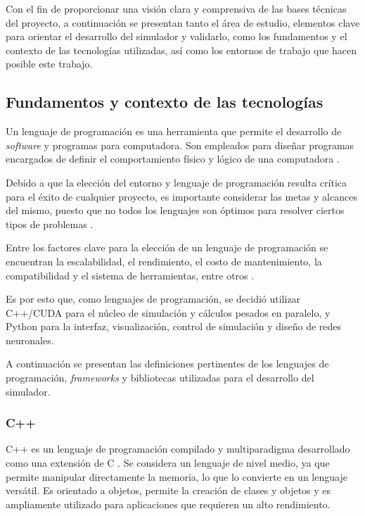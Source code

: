Con el fin de proporcionar una visión clara y comprensiva de las bases técnicas del proyecto, a continuación se presentan tanto el área de estudio, elementos clave para orientar el desarrollo del simulador y validarlo, como los fundamentos y el contexto de las tecnologías utilizadas, así como los entornos de trabajo que hacen posible este trabajo. 

\subsection{Fundamentos y contexto de las tecnologías}

Un lenguaje de programación es una herramienta que permite el desarrollo de \textit{software} y programas para computadora. Son empleados para diseñar programas encargados de definir el comportamiento físico y lógico de una computadora \cite{uapa2025_lenguajes}.

Debido a que la elección del entorno y lenguaje de programación resulta crítica para el éxito de cualquier proyecto, es importante considerar las metas y alcances del mismo, puesto que no todos los lenguajes son óptimos para resolver ciertos tipos de problemas \cite{clickpanda2023_entorno}.

Entre los factores clave para la elección de un lenguaje de programación se encuentran la escalabilidad, el rendimiento, el costo de mantenimiento, la compatibilidad y el sistema de herramientas, entre otros \cite{clickpanda2023_entorno}.

Es por esto que, como lenguajes de programación, se decidió utilizar C++/CUDA para el núcleo de simulación y cálculos pesados en paralelo, y Python para la interfaz, visualización, control de simulación y diseño de redes neuronales. 

A continuación se presentan las definiciones pertinentes de los lenguajes de programación, \textit{frameworks} y bibliotecas utilizadas para el desarrollo del simulador.

\subsubsection{C++}

C++ es un lenguaje de programación compilado y multiparadigma desarrollado como una extensión de C \cite{valladolid_c}. Se considera un lenguaje de nivel medio, ya que permite manipular directamente la memoria, lo que lo convierte en un lenguaje versátil. Es orientado a objetos, permite la creación de clases y objetos y es ampliamente utilizado para aplicaciones que requieren un alto rendimiento.

